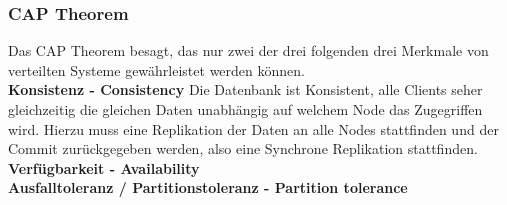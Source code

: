 \begin{table}[]
\caption{Quorum Beispiele}
\label{tab:quorum-beispiele}
\end{table}
\subsubsection{CAP Theorem}
Das CAP Theorem besagt, das nur zwei der drei folgenden drei Merkmale von verteilten Systeme gewährleistet werden können\cite{EE6EQHU2}.
\\\textbf{Konsistenz - Consistency}
Die Datenbank ist Konsistent, alle Clients seher gleichzeitig die gleichen Daten unabhängig auf welchem Node das Zugegriffen wird.
Hierzu muss eine Replikation der Daten an alle Nodes stattfinden und der Commit zurückgegeben werden, also eine Synchrone Replikation stattfinden.
\\\textbf{Verfügbarkeit - Availability}
\\\textbf{Ausfalltoleranz / Partitionstoleranz - Partition tolerance}

